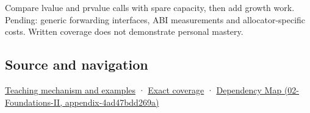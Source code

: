 Compare lvalue and prvalue calls with spare capacity, then add growth work. Pending: generic forwarding interfaces, ABI measurements and allocator-specific costs. Written coverage does not demonstrate personal mastery.

\subsection{Source and navigation}\label{source-and-navigation}

\href{Continuous\%20Notes/Computing\%20Foundations\%20-\%20From\%20Bits\%20to\%20C++\%20and\%20Systems\%20APIs\#A\%20value\%20crosses\%20the\%20function\%20boundary}{Teaching mechanism and examples} · \hyperref[appendix-fd090d982a15]{Exact coverage} · \href{}{Dependency Map (02-Foundations-II, appendix-4ad47bdd269a)}
